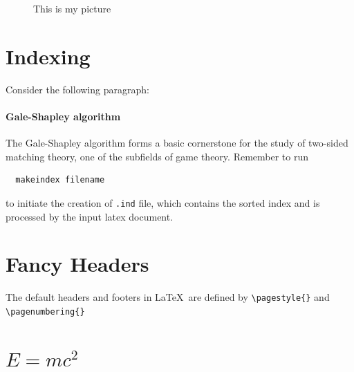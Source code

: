 \documentclass[a4paper,11pt]{article}
\begin{document}
\begin{figure}[!htbp]
  \centering
  \caption{This is my picture}
  \label{}
\end{figure}

\section{Indexing}
Consider the following paragraph:
\paragraph{Gale-Shapley algorithm}
The Gale-Shapley
algorithm
forms a basic cornerstone for the study of two-sided
matching theory,
one of the subfields of
game theory.
\bigbreak
Remember to run
\begin{verbatim}
  makeindex filename
\end{verbatim}
to initiate the creation of \verb+.ind+ file, which contains the
sorted index and is processed by the input latex document.
\printindex

\section{Fancy Headers}
The default headers and footers in \LaTeX~are defined
by \verb+\pagestyle{}+ and \verb+\pagenumbering{}+

\section{\texorpdfstring{$E=mc^2$}{E=mc**2}}
\end{document}
